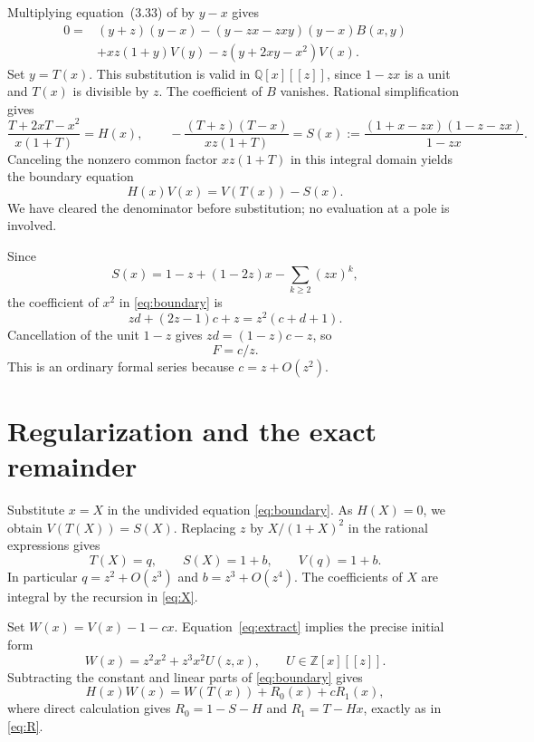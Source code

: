 \documentclass[11pt]{article}
\newcommand{\Z}{\mathbb Z}
\newcommand{\Q}{\mathbb Q}
\begin{document}
Multiplying equation~(3.33) of \cite{BrittBeaton} by $y-x$ gives
\begin{equation}\label{eq:cleared}
\begin{split}
0={}&(y+z)(y-x)-(y-zx-zxy)(y-x)B(x,y)\\
 &+xz(1+y)V(y)-z(y+2xy-x^2)V(x).
\end{split}
\end{equation}
Set $y=T(x)$. This substitution is valid in $\Q[x][[z]]$,
since $1-zx$ is a unit and $T(x)$ is divisible by $z$.
The coefficient of $B$ vanishes. Rational simplification gives
\[
 \frac{T+2xT-x^2}{x(1+T)}=H(x),\qquad
 -\frac{(T+z)(T-x)}{xz(1+T)}
 =S(x):=\frac{(1+x-zx)(1-z-zx)}{1-zx}.
\]
Canceling the nonzero common factor $xz(1+T)$ in this integral domain
yields the boundary equation
\begin{equation}\label{eq:boundary}
 H(x)V(x)=V(T(x))-S(x).
\end{equation}
We have cleared the denominator before substitution; no evaluation at
a pole is involved.

Since
\[
 S(x)=1-z+(1-2z)x-\sum_{k\ge2}(zx)^k,
\]
the coefficient of $x^2$ in \eqref{eq:boundary} is
\[
 zd+(2z-1)c+z=z^2(c+d+1).
\]
Cancellation of the unit $1-z$ gives $zd=(1-z)c-z$, so
\begin{equation}\label{eq:c}
 F=c/z.
\end{equation}
This is an ordinary formal series because $c=z+O(z^2)$.

\section{Regularization and the exact remainder}

Substitute $x=X$ in the undivided equation \eqref{eq:boundary}.
As $H(X)=0$, we obtain $V(T(X))=S(X)$.
Replacing $z$ by $X/(1+X)^2$ in the rational expressions gives
\begin{equation}\label{eq:kernelvalue}
 T(X)=q,\qquad S(X)=1+b,\qquad V(q)=1+b.
\end{equation}
In particular $q=z^2+O(z^3)$ and $b=z^3+O(z^4)$.
The coefficients of $X$ are integral by the recursion in \eqref{eq:X}.

Set $W(x)=V(x)-1-cx$. Equation~\eqref{eq:extract} implies the precise
initial form
\begin{equation}\label{eq:Winitial}
 W(x)=z^2x^2+z^3x^2U(z,x),\qquad U\in\Z[x][[z]].
\end{equation}
Subtracting the constant and linear parts of \eqref{eq:boundary} gives
\begin{equation}\label{eq:regular}
 H(x)W(x)=W(T(x))+R_0(x)+cR_1(x),
\end{equation}
where direct calculation gives
$R_0=1-S-H$ and $R_1=T-Hx$, exactly as in \eqref{eq:R}.
\end{document}
